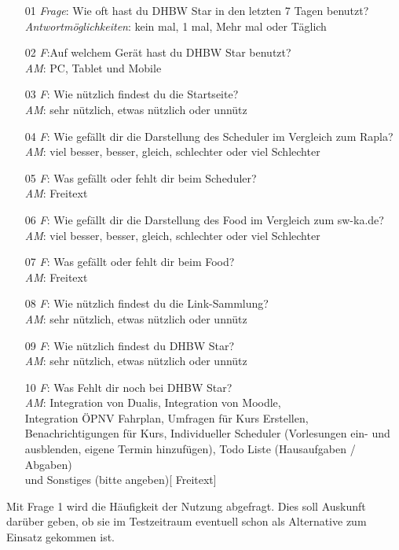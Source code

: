 \begin{itemize}
	\item[01] {\emph{Frage}: Wie oft hast du DHBW Star in den letzten 7 Tagen benutzt?\\
		\emph{Antwortmöglichkeiten}: kein mal, 1 mal, Mehr mal oder Täglich}
	\item[02]{\emph{F}:Auf welchem Gerät hast du DHBW Star benutzt?\\
		\emph{AM}: PC, Tablet und Mobile}
	\item[03]{\emph{F}: Wie nützlich findest du die Startseite?\\
		\emph{AM}: sehr nützlich, etwas nützlich oder unnütz}
	\item[04]{\emph{F}: Wie gefällt dir die Darstellung des Scheduler im Vergleich zum Rapla?\\
		\emph{AM}: viel besser, besser, gleich, schlechter oder viel Schlechter}
	\item[05]{\emph{F}: Was gefällt oder fehlt dir beim Scheduler?\\
		\emph{AM}: Freitext}
	\item[06]{\emph{F}: Wie gefällt dir die Darstellung des Food im Vergleich zum sw-ka.de?\\
		\emph{AM}: viel besser, besser, gleich, schlechter oder viel Schlechter}
	\item[07]{\emph{F}: Was gefällt oder fehlt dir beim Food?\\
		\emph{AM}: Freitext}
	\item[08]{\emph{F}: Wie nützlich findest du die Link-Sammlung?\\
		\emph{AM}: sehr nützlich, etwas nützlich oder unnütz}
	\item[09]{\emph{F}: Wie nützlich findest du DHBW Star?\\
		\emph{AM}: sehr nützlich, etwas nützlich oder unnütz}
	\item[10]{\emph{F}: Was Fehlt dir noch bei DHBW Star?\\
		\emph{AM}: Integration von Dualis, Integration von Moodle,\\ Integration ÖPNV Fahrplan, Umfragen für Kurs Erstellen,\\ Benachrichtigungen für Kurs, Individueller Scheduler (Vorlesungen ein- und ausblenden, eigene Termin hinzufügen), Todo Liste (Hausaufgaben / Abgaben)\\ und Sonstiges (bitte angeben)[ Freitext]}
\end{itemize}
Mit Frage 1 wird die Häufigkeit der Nutzung abgefragt. Dies soll Auskunft darüber geben, ob sie im Testzeitraum eventuell schon als Alternative zum Einsatz gekommen ist.
